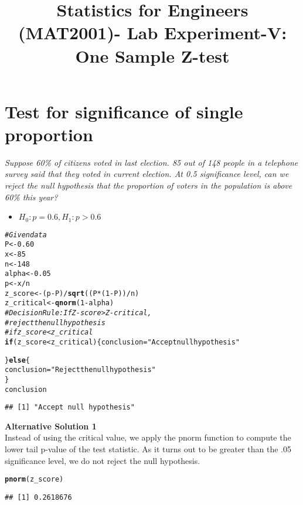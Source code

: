 \documentclass{article}\usepackage[]{graphicx}\usepackage[]{xcolor}
\date{}
\title{\textbf{Statistics for Engineers (MAT2001)- Lab  Experiment-V:  One Sample Z-test}}
\makeatletter
\newcommand{\hlnum}[1]{\textcolor[rgb]{0.686,0.059,0.569}{#1}}%
\newcommand{\hlsng}[1]{\textcolor[rgb]{0.192,0.494,0.8}{#1}}%
\newcommand{\hlcom}[1]{\textcolor[rgb]{0.678,0.584,0.686}{\textit{#1}}}%
\newcommand{\hlopt}[1]{\textcolor[rgb]{0,0,0}{#1}}%
\newcommand{\hldef}[1]{\textcolor[rgb]{0.345,0.345,0.345}{#1}}%
\newcommand{\hlkwa}[1]{\textcolor[rgb]{0.161,0.373,0.58}{\textbf{#1}}}%
\newcommand{\hlkwb}[1]{\textcolor[rgb]{0.69,0.353,0.396}{#1}}%
\newcommand{\hlkwd}[1]{\textcolor[rgb]{0.737,0.353,0.396}{\textbf{#1}}}%
\newenvironment{kframe}{%
 \def\at@end@of@kframe{}%
 \ifinner\ifhmode%
  \def\at@end@of@kframe{\end{minipage}}%
  \begin{minipage}{\columnwidth}%
 \fi\fi%
 \def\FrameCommand##1{\hskip\@totalleftmargin \hskip-\fboxsep
 \colorbox{shadecolor}{##1}\hskip-\fboxsep
     \hskip-\linewidth \hskip-\@totalleftmargin \hskip\columnwidth}%
 \MakeFramed {\advance\hsize-\width
   \@totalleftmargin\z@ \linewidth\hsize
   \@setminipage}}%
 {\par\unskip\endMakeFramed%
 \at@end@of@kframe}
\newenvironment{knitrout}{}{} %
\makeatother
\begin{document}
\maketitle
\section{Test for significance of single proportion}
\emph{Suppose 60\% of citizens voted in last election. 85 out of 148 people in a telephone
survey said that they voted in current election. At 0.5 significance level, can we
reject the null hypothesis that the proportion of voters in the population is above
60\% this year?}

 \begin{itemize}
  \item $H_0:p=0.6, H_1: p>0.6$
\end{itemize}
\begin{knitrout}
\color{fgcolor}\begin{kframe}
\begin{alltt}
\hlcom{# Given data}
\hldef{P} \hlkwb{<-} \hlnum{0.60}
\hldef{x} \hlkwb{<-} \hlnum{85}
\hldef{n} \hlkwb{<-} \hlnum{148}
\hldef{alpha} \hlkwb{<-} \hlnum{0.05}
\hldef{p} \hlkwb{<-} \hldef{x} \hlopt{/} \hldef{n}
\hldef{z_score} \hlkwb{<-} \hldef{(p} \hlopt{-} \hldef{P)} \hlopt{/} \hlkwd{sqrt}\hldef{((P}\hlopt{*} \hldef{(}\hlnum{1} \hlopt{-} \hldef{P))} \hlopt{/} \hldef{n)}
\hldef{z_critical} \hlkwb{<-} \hlkwd{qnorm}\hldef{(}\hlnum{1} \hlopt{-} \hldef{alpha)}
\hlcom{# Decision Rule: If Z-score > Z-critical,}
\hlcom{# reject the null hypothesis}
\hlcom{# if z_score < z_critical}
\hlkwa{if} \hldef{(z_score} \hlopt{<} \hldef{z_critical) \{conclusion}\hlkwb{=}\hlsng{"Accept null hypothesis"}

\hldef{\}} \hlkwa{else} \hldef{\{}
  \hldef{conclusion} \hlkwb{=} \hlsng{"Reject the null hypothesis"}
\hldef{\}}
\hldef{conclusion}
\end{alltt}
\begin{verbatim}
## [1] "Accept null hypothesis"
\end{verbatim}
\end{kframe}
\end{knitrout}
\textbf{Alternative Solution 1}\\
Instead of using the critical value, we apply the pnorm function to compute the
lower tail p-value of the test statistic. As it turns out to be greater than the .05
significance level, we do not reject the null hypothesis.
\begin{knitrout}
\color{fgcolor}\begin{kframe}
\begin{alltt}
\hlkwd{pnorm}\hldef{(z_score)}
\end{alltt}
\begin{verbatim}
## [1] 0.2618676
\end{verbatim}
\end{kframe}
\end{knitrout}
\end{document}

